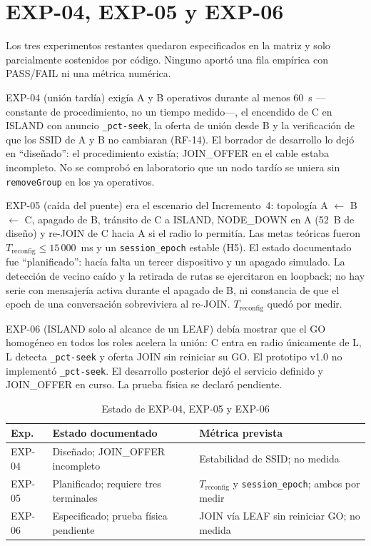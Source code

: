 \documentclass[12pt,oneside]{scrreprt}
\begin{document}
\section{EXP-04, EXP-05 y EXP-06}

Los tres experimentos restantes quedaron especificados en la matriz y solo parcialmente sostenidos por código. Ninguno aportó una fila empírica con PASS/FAIL ni una métrica numérica.

EXP-04 (unión tardía) exigía A y B operativos durante al menos 60~s ---constante de procedimiento, no un tiempo medido---, el encendido de C en ISLAND con anuncio \texttt{\_pct-seek}, la oferta de unión desde B y la verificación de que los SSID de A y B no cambiaran (RF-14). El borrador de desarrollo lo dejó en \enquote{diseñado}: el procedimiento existía; JOIN\_OFFER en el cable estaba incompleto. No se comprobó en laboratorio que un nodo tardío se uniera sin \texttt{removeGroup} en los ya operativos.

EXP-05 (caída del puente) era el escenario del Incremento~4: topología A $\leftarrow$ B $\leftarrow$ C, apagado de B, tránsito de C a ISLAND, NODE\_DOWN en A (52~B de diseño) y re-JOIN de C hacia A si el radio lo permitía. Las metas teóricas fueron $T_{\mathrm{reconfig}} \leq 15\,000$~ms y un \texttt{session\_epoch} estable (H5). El estado documentado fue \enquote{planificado}: hacía falta un tercer dispositivo y un apagado simulado. La detección de vecino caído y la retirada de rutas se ejercitaron en loopback; no hay serie con mensajería activa durante el apagado de B, ni constancia de que el epoch de una conversación sobreviviera al re-JOIN. $T_{\mathrm{reconfig}}$ quedó por medir.

EXP-06 (ISLAND solo al alcance de un LEAF) debía mostrar que el GO homogéneo en todos los roles acelera la unión: C entra en radio únicamente de L, L detecta \texttt{\_pct-seek} y oferta JOIN sin reiniciar su GO. El prototipo v1.0 no implementó \texttt{\_pct-seek}. El desarrollo posterior dejó el servicio definido y JOIN\_OFFER en curso. La prueba física se declaró pendiente.

\begin{table}[H]
\centering
\singlespacing
\caption{Estado de EXP-04, EXP-05 y EXP-06}
\label{tab:exp04-06}
\renewcommand{\arraystretch}{1.15}
\begin{tabularx}{\textwidth}{@{} l l X @{}}
\toprule
\textbf{Exp.} & \textbf{Estado documentado} & \textbf{Métrica prevista} \\
\midrule
EXP-04 & Diseñado; JOIN\_OFFER incompleto & Estabilidad de SSID; no medida \\
EXP-05 & Planificado; requiere tres terminales & $T_{\mathrm{reconfig}}$ y \texttt{session\_epoch}; ambos por medir \\
EXP-06 & Especificado; prueba física pendiente & JOIN vía LEAF sin reiniciar GO; no medida \\
\bottomrule
\end{tabularx}
\end{table}
\end{document}
